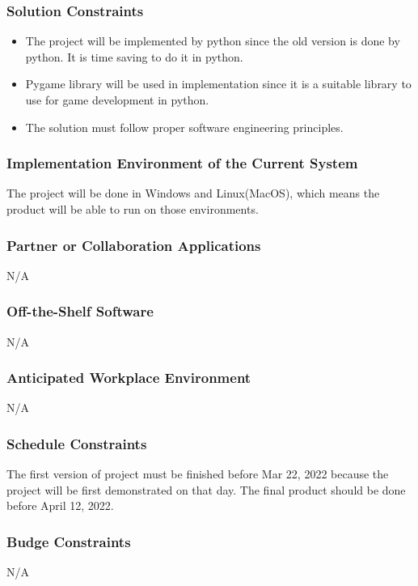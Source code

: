 \documentclass[12pt]{article}
\begin{document}
\subsubsection{Solution Constraints}
\begin{itemize}
\item The project will be implemented by python since the old version is done by python. It is time saving to do it in python.
\item Pygame library will be used in implementation since it
is a suitable library to use for game development in python.
\item The solution must follow proper software engineering
principles.
\end{itemize}
\subsubsection{Implementation Environment of the Current System}
The project will be done in Windows and Linux(MacOS), which means the product will be able to run on those environments.
\subsubsection{Partner or Collaboration Applications}
N/A
\subsubsection{Off-the-Shelf Software}
N/A
\subsubsection{Anticipated Workplace Environment}
N/A
\subsubsection{Schedule Constraints}
The first version of project must be finished before Mar 22, 2022 because the project will be first demonstrated on that day. The final product should be done before April 12, 2022.
\subsubsection{Budge Constraints}
N/A
\end{document}
